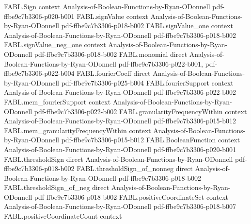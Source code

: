 \begin{theorem}
\label{FABL.pmfExpectation_noiseKernel_monomial}
\leanok
{}
\proofstep
  {FABL.Sign}
  {context}
  {Analysis-of-Boolean-Functions-by-Ryan-ODonnell}
  {pdf-ffbe9c7b3306-p020-b001}
\proofstep
  {FABL.signValue}
  {context}
  {Analysis-of-Boolean-Functions-by-Ryan-ODonnell}
  {pdf-ffbe9c7b3306-p018-b002}
\proofstep
  {FABL.signValue_one}
  {context}
  {Analysis-of-Boolean-Functions-by-Ryan-ODonnell}
  {pdf-ffbe9c7b3306-p018-b002}
\proofstep
  {FABL.signValue_neg_one}
  {context}
  {Analysis-of-Boolean-Functions-by-Ryan-ODonnell}
  {pdf-ffbe9c7b3306-p018-b002}
\proofstep
  {FABL.monomial}
  {direct}
  {Analysis-of-Boolean-Functions-by-Ryan-ODonnell}
  {pdf-ffbe9c7b3306-p022-b001,
    pdf-ffbe9c7b3306-p022-b004}
\proofstep
  {FABL.fourierCoeff}
  {direct}
  {Analysis-of-Boolean-Functions-by-Ryan-ODonnell}
  {pdf-ffbe9c7b3306-p025-b004}
\proofstep
  {FABL.fourierSupport}
  {context}
  {Analysis-of-Boolean-Functions-by-Ryan-ODonnell}
  {pdf-ffbe9c7b3306-p022-b002}
\proofstep
  {FABL.mem_fourierSupport}
  {context}
  {Analysis-of-Boolean-Functions-by-Ryan-ODonnell}
  {pdf-ffbe9c7b3306-p022-b002}
\proofstep
  {FABL.granularityFrequencyWithin}
  {context}
  {Analysis-of-Boolean-Functions-by-Ryan-ODonnell}
  {pdf-ffbe9c7b3306-p015-b012}
\proofstep
  {FABL.mem_granularityFrequencyWithin}
  {context}
  {Analysis-of-Boolean-Functions-by-Ryan-ODonnell}
  {pdf-ffbe9c7b3306-p015-b012}
\proofstep
  {FABL.BooleanFunction}
  {context}
  {Analysis-of-Boolean-Functions-by-Ryan-ODonnell}
  {pdf-ffbe9c7b3306-p020-b001}
\proofstep
  {FABL.thresholdSign}
  {direct}
  {Analysis-of-Boolean-Functions-by-Ryan-ODonnell}
  {pdf-ffbe9c7b3306-p018-b002}
\proofstep
  {FABL.thresholdSign_of_nonneg}
  {direct}
  {Analysis-of-Boolean-Functions-by-Ryan-ODonnell}
  {pdf-ffbe9c7b3306-p018-b002}
\proofstep
  {FABL.thresholdSign_of_neg}
  {direct}
  {Analysis-of-Boolean-Functions-by-Ryan-ODonnell}
  {pdf-ffbe9c7b3306-p018-b002}
\proofstep
  {FABL.positiveCoordinateSet}
  {context}
  {Analysis-of-Boolean-Functions-by-Ryan-ODonnell}
  {pdf-ffbe9c7b3306-p018-b007}
\proofstep
  {FABL.positiveCoordinateCount}
  {context}

\end{theorem}
